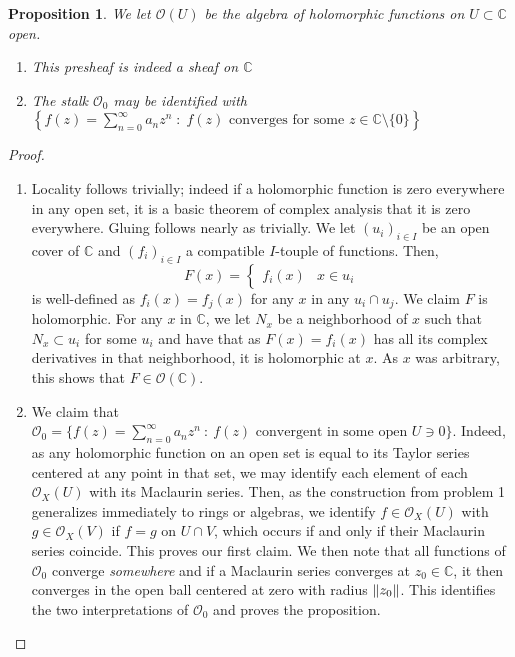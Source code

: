\documentclass[english]{article}
\DeclarePairedDelimiter\norm{\lVert}{\rVert}%
\newcommand{\CC}{\mathbb{C}}
\newcommand{\OO}{\mathcal{O}}
\newtheorem*{proposition*}{Proposition}
\theoremstyle{remark}
\theoremstyle{definition}
\begin{document}
\begin{proposition*}
	We let $\OO(U)$ be the algebra of holomorphic functions on $U\subset \CC$ open.
	\begin{enumerate}[label=\emph{\roman*)}]
	\item  This presheaf is indeed a sheaf on $\CC$
	\item The stalk $\OO_0$ may be identified with $\left\{f(z)=\sum_{n=0}^\infty a_nz^n \;:\;f(z)\text{ converges for some }z\in \CC\setminus \{0 \}\right\}$
	
	\end{enumerate}
\end{proposition*}
\begin{proof}
	\begin{enumerate}[label=\emph{\roman*)}]
\item Locality follows trivially; indeed if a holomorphic function is zero everywhere in any open set, it is a basic theorem of complex analysis that it is zero everywhere. Gluing follows nearly as trivially. We let $(u_i)_{i\in I}$ be an open cover of $\CC$ and $(f_i)_{i\in I}$ a compatible $I$-touple of functions. Then, $$F(x)=\begin{cases}f_i(x)&x\in u_i
\end{cases}$$ is well-defined as $f_i(x)=f_j(x)$ for any $x$ in any $u_i\cap u_j$. We claim $F$ is holomorphic. For any $x$ in $\CC$, we let $N_x$ be a neighborhood of $x$ such that $N_x\subset u_i$ for some $u_i$ and have that as $F(x)=f_i(x)$ has all its complex derivatives in that neighborhood, it is holomorphic at $x$. As $x$ was arbitrary, this shows that $F\in \OO(\CC)$.
\item We claim that $\OO_0=\{f(z)=\sum_{n=0}^\infty a_nz^n\::\:f(z)\text{ convergent in some open }U\ni 0\}$. Indeed, as any holomorphic function on an open set is equal to its Taylor series centered at any point in that set, we may identify each element of each $\OO_X(U)$ with its Maclaurin series. Then, as the construction from problem 1 generalizes immediately to rings or algebras, we identify $f\in \OO_X(U)$ with $g\in \OO_X(V)$ if $f=g$ on $U\cap V$, which occurs if and only if their Maclaurin series coincide. This proves our first claim. We then note that all functions of $\OO_0$ converge \emph{somewhere} and if a Maclaurin series converges at $z_0\in \CC$, it then converges in the open ball centered at zero with radius $\norm{z_0}$. This identifies the two interpretations of $\OO_0$ and proves the proposition.
\end{enumerate}

\end{proof}
\end{document}

